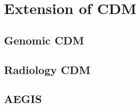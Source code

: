 \documentclass[]{book}
\begin{document}
\hypertarget{extension-of-cdm}{%
\chapter{Extension of CDM}\label{extension-of-cdm}}

\hypertarget{genomic-cdm}{%
\section{Genomic CDM}\label{genomic-cdm}}

\hypertarget{radiology-cdm}{%
\section{Radiology CDM}\label{radiology-cdm}}

\hypertarget{aegis}{%
\section{AEGIS}\label{aegis}}


\end{document}
